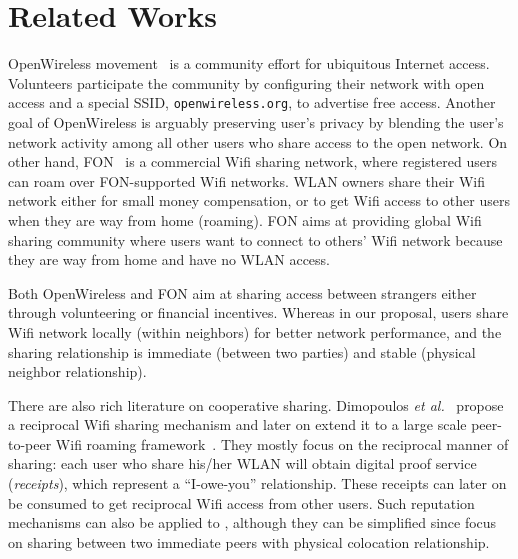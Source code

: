 \section{Related Works}
\label{sec:related}

OpenWireless movement~\cite{openwireless} is a community effort for ubiquitous
Internet access. Volunteers participate the community by configuring their
\wifi{} network with open access and a special SSID, \texttt{openwireless.org},
to advertise free access. Another goal of OpenWireless is arguably preserving
user's privacy by blending the user's network activity among all other users who
share access to the open \wifi{} network. On other hand, FON~\cite{fon} is a
commercial Wifi sharing network, where registered users can roam over
FON-supported Wifi networks. WLAN owners share their Wifi network either for
small money compensation, or to get Wifi access to other users when they are way
from home (roaming). FON aims at providing global Wifi sharing community where
users want to connect to others' Wifi network because they are way from home and
have no WLAN access. 

Both OpenWireless and FON aim at sharing \wifi{} access between strangers either
through volunteering or financial incentives. Whereas in our proposal, users share
Wifi network locally (within neighbors) for better network performance, and the
sharing relationship is immediate (between two parties) and stable (physical
neighbor relationship).

There are also rich literature on cooperative \wifi{} sharing. Dimopoulos
\textit{et al.}~\cite{efstathiou2010controlled} propose a reciprocal Wifi
sharing mechanism and later on extend it to a large scale peer-to-peer Wifi
roaming framework~\cite{dimopoulos2010exploiting}. They mostly focus on the
reciprocal manner of sharing: each user who share his/her WLAN will obtain
digital proof service (\textit{receipts}), which represent a ``I-owe-you''
relationship. These receipts can later on be consumed to get reciprocal Wifi
access from other users. Such reputation mechanisms can also be applied to
\wisefi{}, although they can be simplified since \wisefi{} focus on sharing
between two immediate peers with physical colocation relationship.
